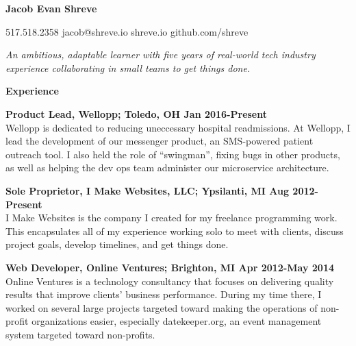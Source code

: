 \documentclass[10pt,letter]{article}
\begin{document}
\hspace*{-1.1in}

\vspace*{-0.25in}
\textbf{\Huge Jacob Evan Shreve}

\vspace{0.25in}

{517.518.2358 \hspace{0.3in} jacob@shreve.io \hspace{0.3in} shreve.io \hspace{0.3in} github.com/shreve}
\vspace{0.25in}

\textit{\large{
An ambitious, adaptable learner with five years of real-world tech industry experience
collaborating in small teams to get things done.
}}
\vspace{0.25in}

\vspace{0.15in}
{\Large\textbf{Experience}}
\vspace{0.15in}

\textbf{Product Lead, Wellopp; Toledo, OH \hfill Jan 2016-Present}\\
Wellopp is dedicated to reducing uneccessary hospital readmissions. At Wellopp, I lead
the development of our messenger product, an SMS-powered patient outreach tool. I
also held the role of ``swingman'', fixing bugs in other products, as well as helping
the dev ops team administer our microservice architecture.
\vspace{0.25in}

\textbf{Sole Proprietor, I Make Websites, LLC; Ypsilanti, MI \hfill Aug 2012-Present}\\
I Make Websites is the company I created for my freelance programming work. This
encapsulates all of my experience working solo to meet with clients, discuss project goals,
develop timelines, and get things done.
\vspace{0.25in}

\textbf{Web Developer, Online Ventures; Brighton, MI \hfill Apr 2012-May 2014}\\
Online Ventures is a technology consultancy that focuses on delivering quality results that
improve clients’ business performance. During my time there, I worked on several large
projects targeted toward making the operations of non-profit organizations easier,
especially datekeeper.org, an event management system targeted toward non-profits.
\vspace{0.25in}
\end{document}
